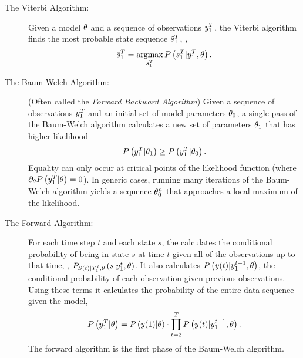\begin{description}
\item[The Viterbi Algorithm:]  Given a model
  $\theta$ and a sequence of observations $y_{1}^{T}$, the
  Viterbi algorithm finds the most probable state sequence $\hat
    s_{1}^{T}$, \ie,
  \begin{equation}
    \label{eq:intro-viterbi}
    \hat s_{1}^{T} = \operatorname*{argmax}_{s_{1}^{T}} P
    \left(s_{1}^{T}|y_{1}^{T},\theta\right).
  \end{equation}
\item[The Baum-Welch Algorithm:] 
  (Often
  called the \emph{Forward Backward Algorithm}) Given a sequence of
  observations $y_{1}^{T}$ and an initial set of model parameters
  $\theta_0$, a single pass of the Baum-Welch algorithm
  calculates a new set of parameters $\theta_1$ that has higher
  likelihood
  \begin{equation}
    \label{eq:intro-fba}
    P\left( y_{1}^{T}|\theta_1 \right) \geq
    P\left( y_{1}^{T}|\theta_0 \right).
  \end{equation}
  Equality can only occur at critical points of the likelihood
  function (where $\partial_\theta P\left(
    y_{1}^{T}|\theta \right) = 0$).  In generic cases,
running many iterations of the Baum-Welch algorithm yields a sequence
$\theta_{0}^{n}$ that approaches a local maximum of the
likelihood.
\item[The Forward Algorithm:] For each time step $t$ and each state
  $s$, the  calculates the conditional
  probability of being in state $s$ at time $t$ given all of the
  observations up to that time, \ie,
  $P_{{S}{(t)}|Y_{1}^{t},\theta} \left(s|y_{1}^{t},
    \theta \right)$. It also calculates
  $P\left({y}{(t)}|y_{1}^{t-1}, \theta \right)$, the
  conditional probability of each observation given previous
  observations.  Using these terms it calculates the probability of
  the entire data sequence given the model,
  \begin{equation*}
    P \left(y_{1}^{T}|\theta \right) =  P \left({y}{(1)}
      |\theta \right) \cdot  \prod_{t=2}^T P
    \left({y}{(t)}|y_{1}^{t-1}, \theta \right).
  \end{equation*}
  The forward algorithm is the first phase of the Baum-Welch algorithm.
\end{description}

